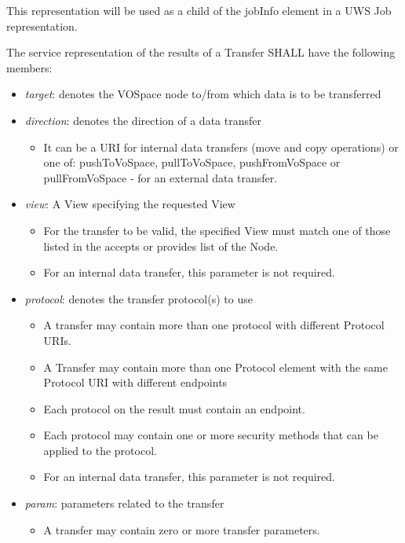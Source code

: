 \documentclass[11pt,a4paper]{ivoa}
\begin{document}
This representation will be used as a child of the jobInfo element in a UWS Job representation.

The service representation of the results of a Transfer SHALL have the following members:

\begin{itemize}
    \item \emph{target}: denotes the VOSpace node to/from which data is to be transferred
    \item \emph{direction}: denotes the direction of a data transfer
        \begin{itemize}
            \item It can be a URI for internal data transfers (move and copy operations) or one of: pushToVoSpace, pullToVoSpace, pushFromVoSpace or pullFromVoSpace - for an external data transfer.
        \end{itemize}
    \item \emph{view}: A View specifying the requested View
        \begin{itemize}
            \item For the transfer to be valid, the specified View must match one of those listed in the accepts or provides list of the Node.
            \item For an internal data transfer, this parameter is not required.
        \end{itemize}
    \item \emph{protocol}: denotes the transfer protocol(s) to use
        \begin{itemize}
            \item A transfer may contain more than one protocol with different Protocol URIs.
            \item A Transfer may contain more than one Protocol element with the same Protocol URI with different endpoints
            \item Each protocol on the result must contain an endpoint.
            \item Each protocol may contain one or more security methods that can be applied to the protocol.
            \item For an internal data transfer, this parameter is not required.
        \end{itemize}
    \item \emph{param}: parameters related to the transfer
        \begin{itemize}
            \item A transfer may contain zero or more transfer parameters.
        \end{itemize}
\end{itemize}
\end{document}
